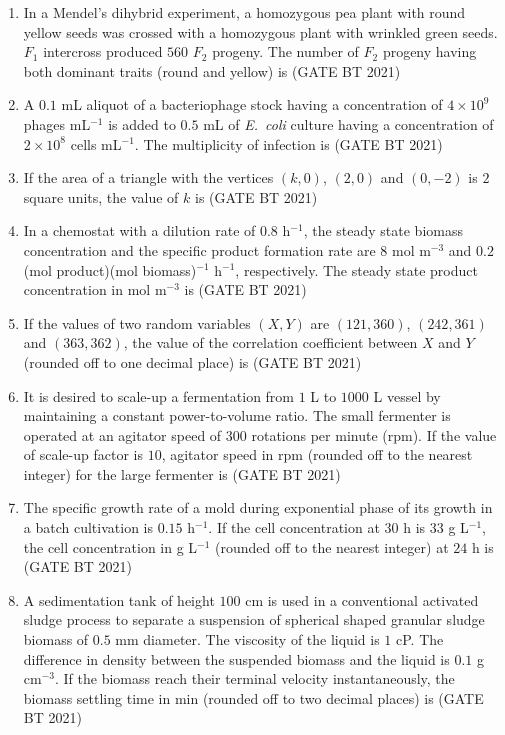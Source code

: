 \documentclass[journal,12pt,onecolumn]{IEEEtran}
\theoremstyle{remark}
\begin{document}
\begin{enumerate}
\item In a Mendel's dihybrid experiment, a homozygous pea plant with round yellow seeds was crossed with a homozygous plant with wrinkled green seeds. $F_1$ intercross produced $560$ $F_2$ progeny. The number of $F_2$ progeny having both dominant traits (round and yellow) is
\hfill (GATE BT 2021)

\item A $0.1$ mL aliquot of a bacteriophage stock having a concentration of $4\times 10^{9}$ phages mL$^{-1}$ is added to $0.5$ mL of \textit{E.\ coli} culture having a concentration of $2\times 10^{8}$ cells mL$^{-1}$. The multiplicity of infection is
\hfill (GATE BT 2021)

\item If the area of a triangle with the vertices $(k, 0)$, $(2, 0)$ and $(0, -2)$ is $2$ square units, the value of $k$ is
\hfill (GATE BT 2021)

\item In a chemostat with a dilution rate of $0.8$ h$^{-1}$, the steady state biomass concentration and the specific product formation rate are $8$ mol m$^{-3}$ and $0.2$ (mol product)(mol biomass)$^{-1}$ h$^{-1}$, respectively. The steady state product concentration in mol m$^{-3}$ is
\hfill (GATE BT 2021)

\item If the values of two random variables $(X, Y)$ are $(121, 360)$, $(242, 361)$ and $(363, 362)$, the value of the correlation coefficient between $X$ and $Y$ (rounded off to one decimal place) is
\hfill (GATE BT 2021)

\item It is desired to scale-up a fermentation from $1$ L to $1000$ L vessel by maintaining a constant power-to-volume ratio. The small fermenter is operated at an agitator speed of $300$ rotations per minute (rpm). If the value of scale-up factor is $10$, agitator speed in rpm (rounded off to the nearest integer) for the large fermenter is
\hfill (GATE BT 2021)

\item The specific growth rate of a mold during exponential phase of its growth in a batch cultivation is $0.15$ h$^{-1}$. If the cell concentration at $30$ h is $33$ g L$^{-1}$, the cell concentration in g L$^{-1}$ (rounded off to the nearest integer) at $24$ h is
\hfill (GATE BT 2021)

\item A sedimentation tank of height $100$ cm is used in a conventional activated sludge process to separate a suspension of spherical shaped granular sludge biomass of $0.5$ mm diameter. The viscosity of the liquid is $1$ cP. The difference in density between the suspended biomass and the liquid is $0.1$ g cm$^{-3}$. If the biomass reach their terminal velocity instantaneously, the biomass settling time in min (rounded off to two decimal places) is
\hfill (GATE BT 2021)


\end{enumerate}
\end{document}
